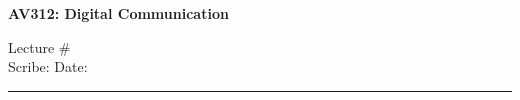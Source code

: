 \documentclass[11pt]{article}
\begin{document}
\begin{center}
\bf\large AV312: Digital Communication
\end{center}

\noindent
Lecture \#         	 %
\\
Scribe:                  %
\hfill
Date:                    %

\noindent
\rule{\textwidth}{1pt}

\medskip

\end{document}

